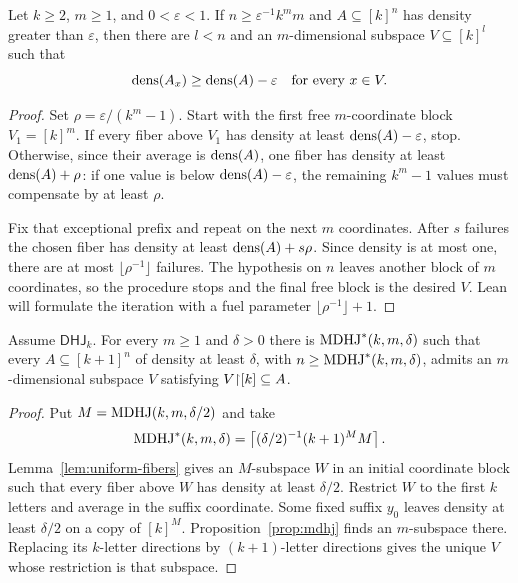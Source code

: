 \begin{lemma}
\label{lem:uniform-fibers}
Let $k\geq2$, $m\geq1$, and $0<\varepsilon<1$.  If
$n\geq\varepsilon^{-1}k^m m$ and $A\subseteq[k]^n$ has density greater than $\varepsilon$, then
there are $l<n$ and an $m$-dimensional subspace $V\subseteq[k]^l$ such that
\[
  \operatorname{dens}(A_x)\geq\operatorname{dens}(A)-\varepsilon
  \quad\text{for every }x\in V.
\]
\end{lemma}

\begin{proof}
Set $\rho=\varepsilon/(k^m-1)$.  Start with the first free $m$-coordinate block $V_1=[k]^m$.
If every fiber above $V_1$ has density at least $\operatorname{dens}(A)-\varepsilon$, stop.  Otherwise, since
their average is $\operatorname{dens}(A)$, one fiber has density at least $\operatorname{dens}(A)+\rho$: if one value is below
$\operatorname{dens}(A)-\varepsilon$, the remaining $k^m-1$ values must compensate by at least $\rho$.

Fix that exceptional prefix and repeat on the next $m$ coordinates.  After $s$ failures the chosen
fiber has density at least $\operatorname{dens}(A)+s\rho$.  Since density is at most one, there are at most
$\lfloor\rho^{-1}\rfloor$ failures.  The hypothesis on $n$ leaves another block of $m$ coordinates,
so the procedure stops and the final free block is the desired $V$.  Lean will formulate the
iteration with a fuel parameter $\lfloor\rho^{-1}\rfloor+1$.
\end{proof}

\begin{corollary}
\label{cor:restricted-subspace}
Assume $\mathsf{DHJ}_k$.  For every $m\geq1$ and $\delta>0$ there is
$\operatorname{MDHJ}^*(k,m,\delta)$ such that every $A\subseteq[k+1]^n$ of density at least $\delta$, with
$n\geq\operatorname{MDHJ}^*(k,m,\delta)$, admits an $m$-dimensional subspace $V$ satisfying
$V\mathord{\upharpoonright}[k]\subseteq A$.
\end{corollary}

\begin{proof}
Put $M=\operatorname{MDHJ}(k,m,\delta/2)$ and take
\[
  \operatorname{MDHJ}^*(k,m,\delta)
  =\left\lceil(\delta/2)^{-1}(k+1)^M M\right\rceil.
\]
Lemma~\ref{lem:uniform-fibers} gives an $M$-subspace $W$ in an initial coordinate block such that
every fiber above $W$ has density at least $\delta/2$.  Restrict $W$ to the first $k$ letters and
average in the suffix coordinate.  Some fixed suffix $y_0$ leaves density at least $\delta/2$ on a
copy of $[k]^M$.  Proposition~\ref{prop:mdhj} finds an $m$-subspace there.  Replacing its $k$-letter
directions by $(k+1)$-letter directions gives the unique $V$ whose restriction is that subspace.
\end{proof}


